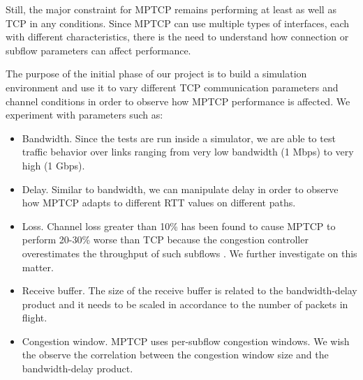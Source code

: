 Still, the major constraint for MPTCP remains performing at least as well as TCP in any conditions. Since MPTCP can use multiple types of interfaces, each with different characteristics, there is the need to understand how connection or subflow parameters can affect performance.

The purpose of the initial phase of our project is to build a simulation environment and use it to vary different TCP communication parameters and channel conditions in order to observe how MPTCP performance is affected. We experiment with parameters such as:
\begin{itemize}
\item Bandwidth. Since the tests are run inside a simulator, we are able to test traffic behavior over links ranging from very low bandwidth (1 Mbps) to very high (1 Gbps).
\item Delay. Similar to bandwidth, we can manipulate delay in order to observe how MPTCP adapts to different RTT values on different paths.
\item Loss. Channel loss greater than 10\% has been found to cause MPTCP to
perform 20-30\% worse than TCP because the congestion controller overestimates
the throughput of such subflows \cite{how-hard-can-it-be}. We further investigate on this matter.
\item Receive buffer. The size of the receive buffer is related to the bandwidth-delay product and it needs to be scaled in accordance to the number of packets in flight.
\item Congestion window. MPTCP uses per-subflow congestion windows. We wish the observe the correlation between the congestion window size and the bandwidth-delay product.
\end{itemize}
